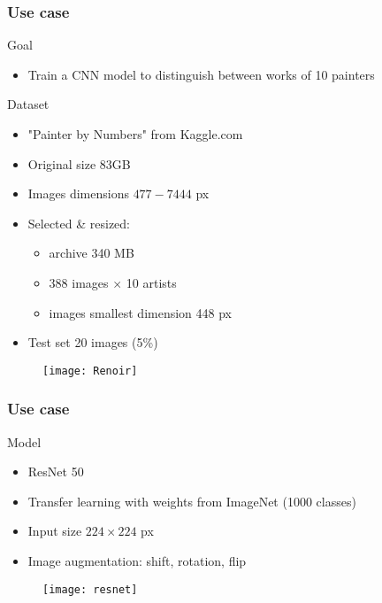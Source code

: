 \documentclass[aspectratio=169]{beamer}
\begin{document}
\begin{frame}
\frametitle{Use case}

\begin{block}{Goal}
	\begin{itemize}
		\item \large Train a CNN model to distinguish between works of 10 painters
	\end{itemize}
\end{block}

\begin{block}{Dataset}
	\begin{multicols*}{2}
	\begin{itemize}
		\item "Painter by Numbers" from Kaggle.com
		\item Original size 83GB
		\item Images dimensions $477 - 7444$ px
		\item Selected \& resized: 
		\begin{itemize}
			\item archive 340 MB
			\item 388 images $\times$ 10 artists
			\item images smallest dimension 448 px 
		\end{itemize}
		\item Test set 20 images (5\%)
	\end{itemize}
	\begin{figure}
		\texttt{[image: Renoir]}
	\end{figure}

	\end{multicols*}
\end{block}

\end{frame}


\begin{frame}
\frametitle{Use case}

\begin{block}{Model}
	\begin{itemize}
		\item ResNet 50
		\item Transfer learning with weights from ImageNet (1000 classes)
		\item Input size $224 \times 224$ px
		\item Image augmentation: shift, rotation, flip
	\end{itemize}
\end{block}
\begin{figure}
	\texttt{[image: resnet]}
\end{figure}

\end{frame}
\end{document}
